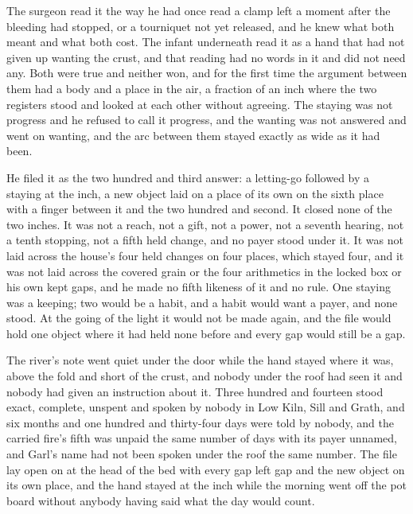 The surgeon read it the way he had once read a clamp left a moment after the bleeding had stopped, or a tourniquet not yet released, and he knew what both meant and what both cost. The infant underneath read it as a hand that had not given up wanting the crust, and that reading had no words in it and did not need any. Both were true and neither won, and for the first time the argument between them had a body and a place in the air, a fraction of an inch where the two registers stood and looked at each other without agreeing. The staying was not progress and he refused to call it progress, and the wanting was not answered and went on wanting, and the arc between them stayed exactly as wide as it had been.

He filed it as the two hundred and third answer: a letting-go followed by a staying at the inch, a new object laid on a place of its own on the sixth place with a finger between it and the two hundred and second. It closed none of the two inches. It was not a reach, not a gift, not a power, not a seventh hearing, not a tenth stopping, not a fifth held change, and no payer stood under it. It was not laid across the house's four held changes on four places, which stayed four, and it was not laid across the covered grain or the four arithmetics in the locked box or his own kept gaps, and he made no fifth likeness of it and no rule. One staying was a keeping; two would be a habit, and a habit would want a payer, and none stood. At the going of the light it would not be made again, and the file would hold one object where it had held none before and every gap would still be a gap.

The river's note went quiet under the door while the hand stayed where it was, above the fold and short of the crust, and nobody under the roof had seen it and nobody had given an instruction about it. Three hundred and fourteen stood exact, complete, unspent and spoken by nobody in Low Kiln, Sill and Grath, and six months and one hundred and thirty-four days were told by nobody, and the carried fire's fifth was unpaid the same number of days with its payer unnamed, and Garl's name had not been spoken under the roof the same number. The file lay open on  at the head of the bed with every gap left gap and the new object on its own place, and the hand stayed at the inch while the morning went off the pot board without anybody having said what the day would count.
